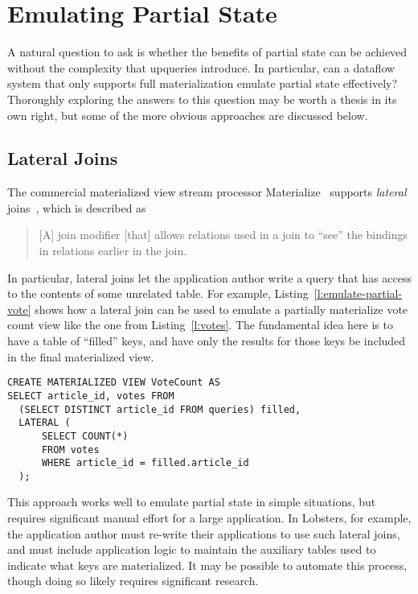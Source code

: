 \section{Emulating Partial State}

A natural question to ask is whether the benefits of partial state can be
achieved without the complexity that upqueries introduce. In particular, can a
dataflow system that only supports full materialization emulate partial state
effectively? Thoroughly exploring the answers to this question may be worth a
thesis in its own right, but some of the more obvious approaches are discussed
below.

\subsection{Lateral Joins}

The commercial materialized view stream processor Materialize~\cite{materialize}
supports \emph{lateral} joins~\cite{lateral-join}, which is described as

\begin{quote}
  [A] join modifier [that] allows relations used in a join to ``see'' the
  bindings in relations earlier in the join.
\end{quote}

In particular, lateral joins let the application author write a query that has
access to the contents of some unrelated table. For example,
Listing~\ref{l:emulate-partial-vote} shows how a lateral join can be used to
emulate a partially materialize vote count view like the one from
Listing~\ref{l:votes}. The fundamental idea here is to have a table of
``filled'' keys, and have only the results for those keys be included in the
final materialized view.

\begin{listing}[h]
  \begin{verbatim}
CREATE MATERIALIZED VIEW VoteCount AS
SELECT article_id, votes FROM
  (SELECT DISTINCT article_id FROM queries) filled,
  LATERAL (
      SELECT COUNT(*)
      FROM votes
      WHERE article_id = filled.article_id
  );
  \end{verbatim}
  \caption{Using a lateral join to emulate partial state in vote.}
  \label{l:emulate-partial-vote}
\end{listing}

This approach works well to emulate partial state in simple situations, but
requires significant manual effort for a large application. In Lobsters, for
example, the application author must re-write their applications to use such
lateral joins, and must include application logic to maintain the auxiliary
tables used to indicate what keys are materialized. It may be possible to
automate this process, though doing so likely requires significant research.


